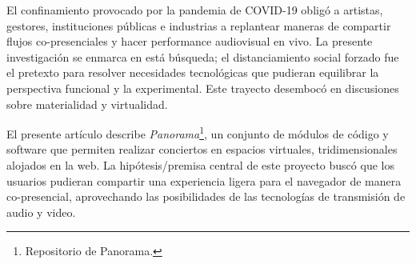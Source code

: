 
El confinamiento provocado por la pandemia de COVID-19 obligó a artistas, gestores, instituciones públicas e industrias a replantear maneras de compartir flujos co-presenciales y hacer performance audiovisual en vivo. La presente investigación se enmarca en está búsqueda; el distanciamiento social forzado fue el pretexto para resolver necesidades tecnológicas que pudieran equilibrar la perspectiva funcional y la experimental. Este trayecto desembocó en discusiones sobre materialidad y virtualidad.                          

El presente artículo describe \textit{Panorama}\footnote{Repositorio de Panorama.}, un conjunto de módulos de código y software que permiten realizar conciertos en espacios virtuales, tridimensionales alojados en la web. La hipótesis/premisa central de este proyecto buscó que los usuarios pudieran compartir una experiencia ligera para el navegador de manera co-presencial, aprovechando las posibilidades de las tecnologías de transmisión de audio y video.  
